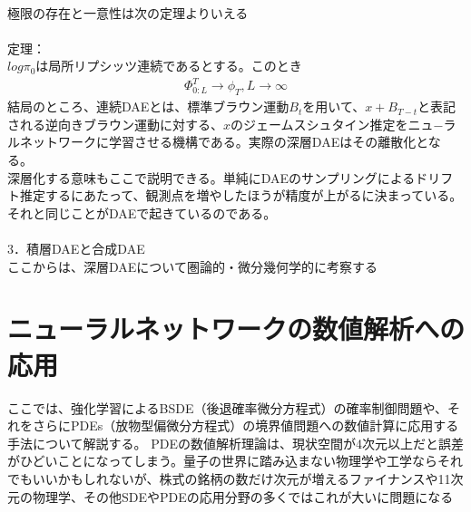 \documentclass{jsarticle}
\begin{document}
　\\
極限の存在と一意性は次の定理よりいえる\\ 
　\\
定理：\\
$log \pi_0$は局所リプシッツ連続であるとする。このとき
\begin{eqnarray}
\Phi^T_{0:L}\rightarrow \phi_T ,L\rightarrow \infty
\end{eqnarray}
結局のところ、連続DAEとは、標準ブラウン運動$B_t$を用いて、$x+B_{T-t}$と表記される逆向きブラウン運動に対する、$x$のジェームスシュタイン推定をニュ−ラルネットワークに学習させる機構である。実際の深層DAEはその離散化となる。\\
深層化する意味もここで説明できる。単純にDAEのサンプリングによるドリフト推定するにあたって、観測点を増やしたほうが精度が上がるに決まっている。それと同じことがDAEで起きているのである。\\
　\\
3．積層DAEと合成DAE\\
ここからは、深層DAEについて圏論的・微分幾何学的に考察する

\newpage
\section{ニューラルネットワークの数値解析への応用}
ここでは、強化学習によるBSDE（後退確率微分方程式）の確率制御問題や、それをさらにPDEs（放物型偏微分方程式）の境界値問題への数値計算に応用する手法について解説する。
PDEの数値解析理論は、現状空間が4次元以上だと誤差がひどいことになってしまう。量子の世界に踏み込まない物理学や工学ならそれでもいいかもしれないが、株式の銘柄の数だけ次元が増えるファイナンスや11次元の物理学、その他SDEやPDEの応用分野の多くではこれが大いに問題になる\\
 
\end{document}
